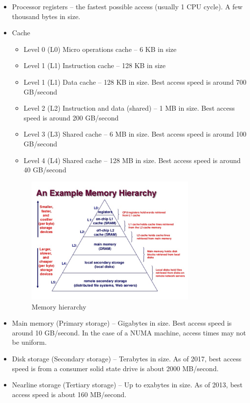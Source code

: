 \documentclass[11pt, conference, onecolumn]{IEEEtran}
\begin{document}
\begin{itemize}
	\item Processor registers – the fastest possible access (usually 1 CPU cycle). A few thousand bytes in size.
	\item Cache
		\begin{itemize}
			\item Level 0 (L0) Micro operations cache – 6 KB  in size
        			\item Level 1 (L1) Instruction cache – 128 KB in size
        			\item Level 1 (L1) Data cache – 128 KB in size. Best access speed is around 700 GB/second
        			\item Level 2 (L2) Instruction and data (shared) – 1 MB in size. Best access speed is around 200 GB/second
        			\item Level 3 (L3) Shared cache – 6 MB in size. Best access speed is around 100 GB/second
        			\item Level 4 (L4) Shared cache – 128 MB in size. Best access speed is around 40 GB/second
		\end{itemize}
\begin{figure}
		\begin{center}
		\includegraphics[width=0.8\textwidth]{memory.png}
		\caption {Memory hierarchy}
		\end{center}	
	\end{figure}
	\item Main memory (Primary storage) – Gigabytes in size. Best access speed is around 10 GB/second. In the case of a NUMA machine, access times may not be uniform.
	\item Disk storage (Secondary storage) – Terabytes in size. As of 2017, best access speed is from a consumer solid state drive is about 2000 MB/second.
	\item Nearline storage (Tertiary storage) – Up to exabytes in size. As of 2013, best access speed is about 160 MB/second.
\end{itemize}
\end{document}
